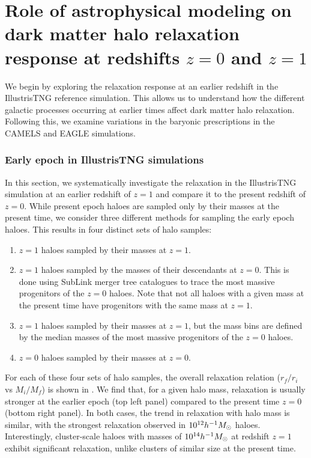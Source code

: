 \chapter{Role of astrophysical modeling on dark matter halo relaxation response at redshifts $z=0$ and $z=1$}
\label{chap:physvar_z01}

We begin by exploring the relaxation response at an earlier redshift in the IllustrisTNG reference simulation. This allows us to understand how the different galactic processes occurring at earlier times affect dark matter halo relaxation. Following this, we examine variations in the baryonic prescriptions in the CAMELS and EAGLE simulations.

\subsection{Early epoch in IllustrisTNG simulations}
\label{sec:res-itng-z01}
In this section, we systematically investigate the relaxation in the IllustrisTNG simulation at an earlier redshift of $z = 1$ and compare it to the present redshift of $z = 0$. While present epoch haloes are sampled only by their masses at the present time, we consider three different methods for sampling the early epoch haloes. This results in four distinct sets of halo samples:

\begin{enumerate}
\item $z=1$ haloes sampled by their masses at $z=1$.
\item $z=1$ haloes sampled by the masses of their descendants at $z=0$. This is done using SubLink merger tree catalogues to trace the most massive progenitors of the $z=0$ haloes. Note that not all haloes with a given mass at the present time have progenitors with the same mass at $z=1$.
\item $z=1$ haloes sampled by their masses at $z=1$, but the mass bins are defined by the median masses of the most massive progenitors of the $z=0$ haloes.
\item $z=0$ haloes sampled by their masses at $z=0$.
\end{enumerate}

For each of these four sets of halo samples, the overall relaxation relation ($r_f/r_i$ vs $M_i/M_f$) is shown in . We find that, for a given halo mass, relaxation is usually stronger at the earlier epoch (top left panel) compared to the present time $z=0$ (bottom right panel). In both cases, the trend in relaxation with halo mass is similar, with the strongest relaxation observed in $10^{12} h^{-1}M_{\odot}$ haloes. Interestingly, cluster-scale haloes with masses of $10^{14} h^{-1}M_{\odot}$ at redshift $z=1$ exhibit significant relaxation, unlike clusters of similar size at the present time.

